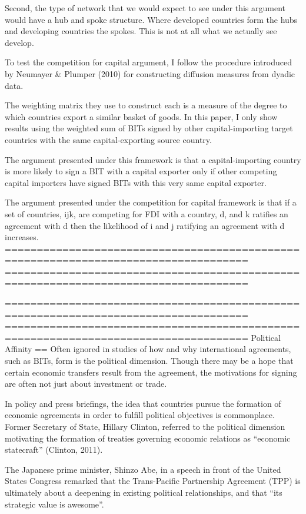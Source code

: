 Second, the type of network that we would expect to see under this argument would have a hub and spoke structure. Where developed countries form the hubs and developing countries the spokes. This is not at all what we actually see develop. 

To test the competition for capital argument, I follow the procedure introduced by Neumayer & Plumper (2010) for constructing diffusion measures from dyadic data. 

The weighting matrix they use to construct each is a measure of the degree to which countries export a similar basket of goods. In this paper, I only show results using the weighted sum of BITs signed by other capital-importing target countries with the same capital-exporting source country. 

The argument presented under this framework is that a capital-importing country is more likely to sign a BIT with a capital exporter only if other competing capital importers have signed BITs with this very same capital exporter.

The argument presented under the competition for capital framework is that if a set of countries, ijk, are competing for FDI with a country, d, and k ratifies an agreement with d then the likelihood of i and j ratifying an agreement with d increases.
====================================================================================
====================================================================================

====================================================================================
====================================================================================
Political Affinity
==
Often ignored in studies of how and why international agreements, such as BITs, form is the political dimension. Though there may be a hope that certain economic transfers result from the agreement, the motivations for signing are often not just about investment or trade. 

In policy and press briefings, the idea that countries pursue the formation of economic agreements in order to fulfill political objectives is commonplace. Former Secretary of State, Hillary Clinton, referred to the political dimension motivating the formation of treaties governing economic relations as “economic statecraft” (Clinton, 2011). 

The Japanese prime minister, Shinzo Abe, in a speech in front of the United States Congress remarked that the Trans-Pacific Partnership Agreement (TPP) is ultimately about a deepening in existing political relationships, and that “its strategic value is awesome”.

